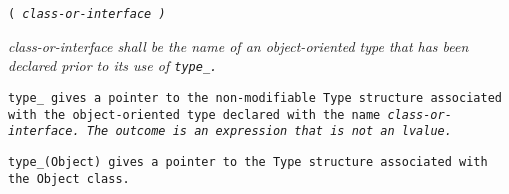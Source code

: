 
 \tt{(} \it{class-or-interface} \tt{)}


\it{class-or-interface} shall be the name of an object-oriented
type that has been declared prior to its use of \tt{type_}.


\tt{type_} gives a pointer to the non-modifiable \tt{Type} structure associated
with the object-oriented type declared with the name \it{class-or-interface}.
The outcome is an expression that is not an lvalue.

\example \tt{type_(Object)} gives a pointer to the
\tt{Type} structure associated with the \tt{Object} class.
